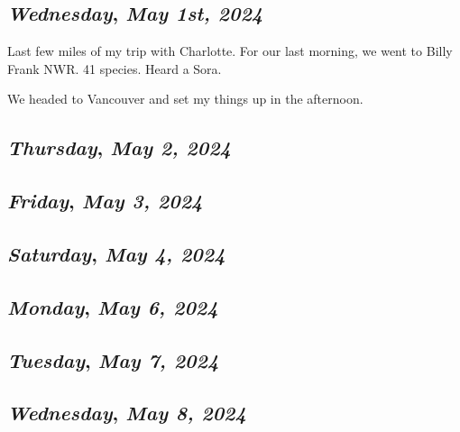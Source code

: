 \begin{center}
\section*{\month}
\end{center}

\def\day{\textit{May 1st, 2024}}
\def\weekday{\textit{Wednesday}}
\subsection*{\weekday, \day}

Last few miles of my trip with Charlotte. For our last morning, we went to Billy Frank NWR. 41 species. Heard a Sora. 

We headed to Vancouver and set my things up in the afternoon. 

\def\day{\textit{May 2, 2024}}
\def\weekday{\textit{Thursday}}
\subsection*{\weekday, \day}

\def\day{\textit{May 3, 2024}}
\def\weekday{\textit{Friday}}
\subsection*{\weekday, \day}

\def\day{\textit{May 4, 2024}}
\def\weekday{\textit{Saturday}}
\subsection*{\weekday, \day}

\def\day{\textit{May 6, 2024}}
\def\weekday{\textit{Monday}}
\subsection*{\weekday, \day}

\def\day{\textit{May 7, 2024}}
\def\weekday{\textit{Tuesday}}
\subsection*{\weekday, \day}

\def\day{\textit{May 8, 2024}}
\def\weekday{\textit{Wednesday}}
\subsection*{\weekday, \day}

